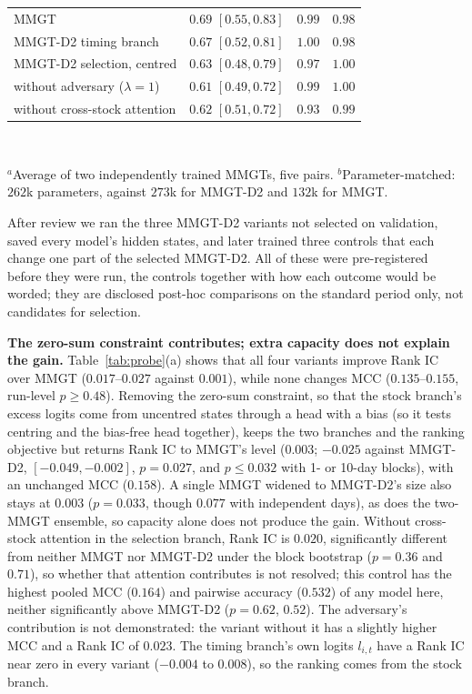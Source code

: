\documentclass[conference]{IEEEtran}
\begin{document}
\begin{table}[t]
{\begin{tabular}{lcccccc}
MMGT & \multicolumn{3}{c}{$0.69$ $[0.55, 0.83]$} & $0.99$ & \multicolumn{2}{c}{$0.98$} \\
MMGT-D2 timing branch & \multicolumn{3}{c}{$0.67$ $[0.52, 0.81]$} & $1.00$ & \multicolumn{2}{c}{$0.98$} \\
MMGT-D2 selection, centred & \multicolumn{3}{c}{$0.63$ $[0.48, 0.79]$} & $0.97$ & \multicolumn{2}{c}{$1.00$} \\
\quad without adversary ($\lambda=1$) & \multicolumn{3}{c}{$0.61$ $[0.49, 0.72]$} & $0.99$ & \multicolumn{2}{c}{$1.00$} \\
\quad without cross-stock attention & \multicolumn{3}{c}{$0.62$ $[0.51, 0.72]$} & $0.93$ & \multicolumn{2}{c}{$0.99$} \\
\bottomrule
\end{tabular}}
\\[3pt]
\parbox{\columnwidth}{\footnotesize $^{a}$Average of two independently trained MMGTs,
five pairs. $^{b}$Parameter-matched: $262$k parameters, against $273$k for MMGT-D2
and $132$k for MMGT.}
\end{table}

After review we ran the three MMGT-D2 variants not selected on validation, saved
every model's hidden states, and later trained three controls that each change one
part of the selected MMGT-D2. All of these were pre-registered before they were run,
the controls together with how each outcome would be worded; they are disclosed
post-hoc comparisons on the standard period only, not candidates for selection.

\textbf{The zero-sum constraint contributes; extra capacity does not explain the
gain.} Table~\ref{tab:probe}(a) shows that all four variants improve Rank IC over
MMGT ($0.017$--$0.027$ against $0.001$), while none changes MCC ($0.135$--$0.155$,
run-level $p\ge0.48$). Removing the zero-sum constraint, so that the stock branch's
excess logits come from uncentred states through a head with a bias (so it tests
centring and the bias-free head together), keeps the two branches and the ranking
objective but returns Rank IC to MMGT's level ($0.003$;
$-0.025$ against MMGT-D2, $[-0.049, -0.002]$, $p=0.027$, and $p\le0.032$ with 1- or
10-day blocks), with an unchanged MCC ($0.158$). A single MMGT widened to MMGT-D2's
size also stays at $0.003$ ($p=0.033$, though $0.077$ with independent days), as does
the two-MMGT ensemble, so capacity alone does not produce the gain. Without
cross-stock attention in the selection branch, Rank IC is $0.020$, significantly
different from neither MMGT nor MMGT-D2 under the block bootstrap ($p=0.36$ and
$0.71$), so whether that attention contributes is not resolved; this control has the
highest pooled MCC ($0.164$) and pairwise accuracy ($0.532$) of any model here,
neither significantly above MMGT-D2 ($p=0.62$, $0.52$). The adversary's
contribution is not demonstrated: the variant without it has a slightly higher MCC
and a Rank IC of $0.023$. The timing branch's own logits $l_{i,t}$ have a Rank IC near
zero in every variant ($-0.004$ to $0.008$), so the ranking comes from the stock branch.
\end{document}
